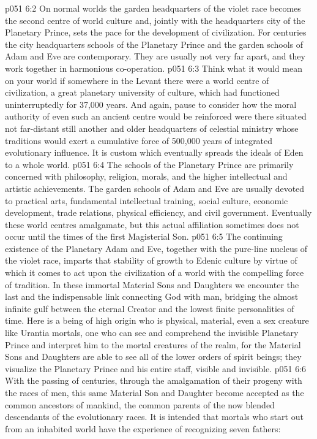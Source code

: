 \vs p051 6:2 On normal worlds the garden headquarters of the violet race becomes the second centre of world culture and, jointly with the headquarters city of the Planetary Prince, sets the pace for the development of civilization. For centuries the city headquarters schools of the Planetary Prince and the garden schools of Adam and Eve are contemporary. They are usually not very far apart, and they work together in harmonious co\hyp{}operation.
\vs p051 6:3 Think what it would mean on your world if somewhere in the Levant there were a world centre of civilization, a great planetary university of culture, which had functioned uninterruptedly for 37,000 years. And again, pause to consider how the moral authority of even such an ancient centre would be reinforced were there situated not far\hyp{}distant still another and older headquarters of celestial ministry whose traditions would exert a cumulative force of 500,000 years of integrated evolutionary influence. It is custom which eventually spreads the ideals of Eden to a whole world.
\vs p051 6:4 The schools of the Planetary Prince are primarily concerned with philosophy, religion, morals, and the higher intellectual and artistic achievements. The garden schools of Adam and Eve are usually devoted to practical arts, fundamental intellectual training, social culture, economic development, trade relations, physical efficiency, and civil government. Eventually these world centres amalgamate, but this actual affiliation sometimes does not occur until the times of the first Magisterial Son.
\vs p051 6:5 \pc The continuing existence of the Planetary Adam and Eve, together with the pure\hyp{}line nucleus of the violet race, imparts that stability of growth to Edenic culture by virtue of which it comes to act upon the civilization of a world with the compelling force of tradition. In these immortal Material Sons and Daughters we encounter the last and the indispensable link connecting God with man, bridging the almost infinite gulf between the eternal Creator and the lowest finite personalities of time. Here is a being of high origin who is physical, material, even a sex creature like Urantia mortals, one who can see and comprehend the invisible Planetary Prince and interpret him to the mortal creatures of the realm, for the Material Sons and Daughters are able to see all of the lower orders of spirit beings; they visualize the Planetary Prince and his entire staff, visible and invisible.
\vs p051 6:6 With the passing of centuries, through the amalgamation of their progeny with the races of men, this same Material Son and Daughter become accepted as the common ancestors of mankind, the common parents of the now blended descendants of the evolutionary races. It is intended that mortals who start out from an inhabited world have the experience of recognizing seven fathers:
